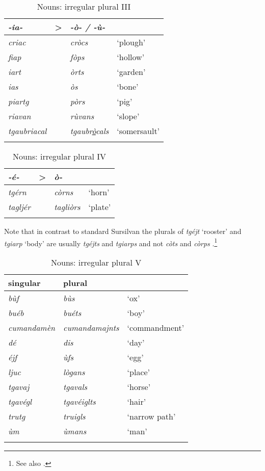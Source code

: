 \begin{table}
\caption{Nouns: irregular plural III} 
\label{irregplIII}
 \begin{tabular}{llll}
  \lsptoprule
   \textit{-ia-} & > & \textit{-ò- / -ù-} \\
  \midrule
\textit{criac} && \textit{cròcs} & `plough'\\
\textit{fiap} && \textit{fòps} & `hollow'\\
\textit{iart}  && \textit{òrts} & `garden'\\
\textit{ias} && \textit{òs} & `bone' \\
\textit{piartg} && \textit{pòrs} & `pig'\\
\textit{riavan} && \textit{rùvans} & `slope'\\
\textit{tgaubriacal} && \textit{tgaubr\underline{ò}cals} & `somersault'  \\
  \lspbottomrule
 \end{tabular}
\end{table}

\begin{table}
	\caption{Nouns: irregular plural IV} 
	\label{irregplIV}
	\begin{tabular}{llll}
		\lsptoprule
		 \textit{-é-} & > & \textit{ò-} & \\
		\midrule
		 \textit{tgérn} & & \textit{còrns} & `horn'\\
		 \textit{tagljér} & & \textit{tagliòrs} & `plate'\\
		\lspbottomrule
	\end{tabular}
\end{table}

Note that in contrast to standard Sursilvan the plurals of \textit{tgéjt} `rooster' and \textit{tgiarp} `body' are usually \textit{tgéjts} and \textit{tgiarps} and not \textit{còts} and \textit{còrps} .\footnote{See also .}


\begin{table}
\caption{Nouns: irregular plural V}
\label{irregplV}
 \begin{tabular}{lll}
  \lsptoprule
singular & plural \\
  \midrule
\textit{bùf} & \textit{bùs} & `ox'\\
\textit{buéb} & \textit{buéts} & `boy'\\
\textit{cumandamèn} & \textit{cumandamajnts} & `commandment'\\
\textit{dé} & \textit{dis} & `day'\\
\textit{éjf} & \textit{ùfs} & `egg'\\
\textit{ljuc}  & \textit{lògans} & `place'\\
\textit{tgavaj} & \textit{tgavals} & `horse'\\
\textit{tgavégl} & \textit{tgavéiglts} & `hair'\\ 
\textit{trutg} & \textit{truigls} & `narrow path'\\
\textit{ùm} & \textit{ùmans} & `man'\\
  \lspbottomrule
 \end{tabular}
\end{table}

